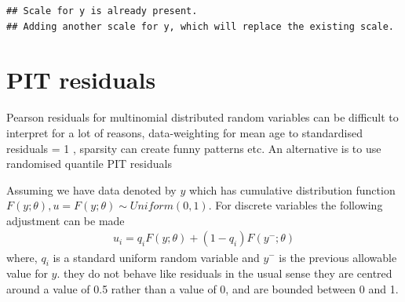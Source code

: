 \documentclass[
]{book}
\begin{document}
\begin{verbatim}
## Scale for y is already present.
## Adding another scale for y, which will replace the existing scale.
\end{verbatim}

\hypertarget{pit-residuals}{%
\section{PIT residuals}\label{pit-residuals}}

Pearson residuals for multinomial distributed random variables can be difficult to interpret for a lot of reasons, data-weighting for mean age to standardised residuals = 1 \citep{francis2011data}, sparsity can create funny patterns etc. An alternative is to use randomised quantile PIT residuals \citep{warton2017pit, dunn1996randomized}

Assuming we have data denoted by \(y\) which has cumulative distribution function \(F(y; \theta), u = F(y; \theta) \sim Uniform(0,1)\). For discrete variables the following adjustment can be made
\begin{align}
u_i = q_i F(y; \theta) + (1 - q_i) F(y^{-}; \theta) 
\end{align}
where, \(q_i\) is a standard uniform random variable and \(y^{-}\) is the previous allowable value for \(y\).
they do not behave like residuals in the usual sense they are centred around a value of 0.5 rather than a value of 0, and are bounded between 0 and 1.
\end{document}
